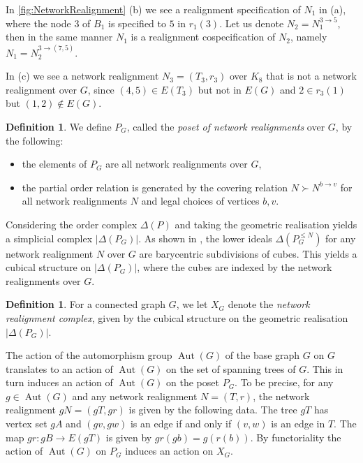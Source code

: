 \documentclass[reqno,dvipsnames]{amsart}
\theoremstyle{plain}
\numberwithin{equation}{section}
\theoremstyle{definition}
\newtheorem{definition}[theorem]{Definition}
\DeclareMathOperator{\Aut}{Aut}
\begin{document}
In \autoref{fig:NetworkRealignment} (b) we see a realignment specification of $N_1$ in (a), where the node $3$ of $B_1$ is specified to $5$ in $r_1(3)$. Let us denote $N_2=N_1^{3\to 5}$, then in the same manner $N_1$ is a realignment cospecification of $N_2$, namely $N_1=N_2^{3\to (7,5)}$.

In (c) we see a network realignment $N_3 = (T_3, r_3)$ over $K_8$ that is not a network realignment over $G$, since $(4,5)\in E(T_3)$ but not in $E(G)$ and $2\in r_3(1)$ but $(1,2)\notin E(G)$.

\begin{definition}
	We define $P_G$, called the \textit{poset of network realignments} over $G$, by the following:
	\begin{itemize}
		\item the elements of $P_G$ are all network realignments over $G$,
		\item the partial order relation is generated by the covering relation $N \succ N^{b\to v}$ for all network realignments $N$ and legal choices of vertices $b,v$.
	\end{itemize}
\end{definition}

Considering the order complex $\Delta (P)$ and taking the geometric realisation yields a simplicial complex $|\Delta (P_G)|$. As shown in \cite{Kozlov25}, the lower ideals $\Delta(P_G^{\leq N})$ for any network realignment $N$ over $G$ are barycentric subdivisions of cubes. This yields a cubical structure on $|\Delta (P_G)|$, where the cubes are indexed by the network realignments over $G$. 

\begin{definition}
	For a connected graph $G$, we let $X_G$ denote the \textit{network realignment complex}, given by the cubical structure on the geometric realisation $|\Delta (P_G)|$.
\end{definition}

	The action of the automorphism group $\Aut(G)$ of the base graph $G$ on $G$ translates to an action of $\Aut(G)$ on the set of spanning trees of $G$. This in turn induces an action of $\Aut(G)$ on the poset $P_G$. To be precise, for any $g\in \Aut(G)$ and any network realignment $N = (T, r)$, the network realignment $gN = (gT,gr)$ is given by the following data. The tree $gT$ has vertex set $gA$ and $(gv,gw)$ is an edge if and only if $(v,w)$ is an edge in $T$. The map $gr\colon gB\to E(gT)$ is given by $gr(gb) = g(r(b))$. By functoriality the action of $\Aut(G)$ on $P_G$ induces an action on $X_G$.
	
\end{document}
